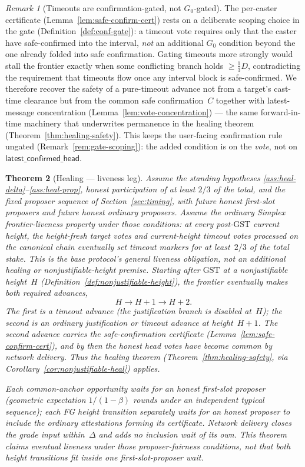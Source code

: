 \ifx\litemode\undefined\documentclass{article}\fi
\newcommand{\GST}{\ensuremath{\mathrm{GST}}\xspace}
\newcommand{\Dvote}{\ensuremath{D}}         %
\newcommand{\Gzero}{\ensuremath{G_{0}}}
\newcommand{\latestConfirmed}{\textsf{latest\_confirmed\_head}\xspace}
\theoremstyle{plain}
\newtheorem{theorem}{Theorem}
\theoremstyle{definition}
\theoremstyle{remark}
\newtheorem{remark}[theorem]{Remark}
\begin{document}
\begin{remark}[Timeouts are confirmation-gated, not \(\Gzero\)-gated]\label{rem:timeout-not-g0}
The per-caster certificate (Lemma~\ref{lem:safe-confirm-cert}) rests on a
deliberate scoping choice in the gate (Definition~\ref{def:conf-gate}): a timeout
vote requires only that the caster have safe-confirmed into the interval,
\emph{not} an additional \(\Gzero\) condition beyond the one already folded into
safe confirmation.  Gating timeouts more strongly would stall the frontier exactly
when some conflicting branch holds \(\geq \tfrac13\Dvote\), contradicting the
requirement that timeouts flow once any interval block is safe-confirmed.  We
therefore recover the safety of a pure-timeout advance not from a target's
cast-time clearance but from the common safe confirmation~\(C\) together with
latest-message concentration (Lemma~\ref{lem:vote-concentration}) --- the same forward-in-time
machinery that underwrites permanence in the healing theorem
(Theorem~\ref{thm:healing-safety}).  This keeps the user-facing confirmation rule
ungated (Remark~\ref{rem:gate-scoping}): the added condition is on the \emph{vote},
not on \(\latestConfirmed\).
\end{remark}

\begin{theorem}[Healing --- liveness leg]\label{thm:healing-liveness}
Assume the standing hypotheses \ref{ass:heal-delta}--\ref{ass:heal-prop}, honest
participation of at least \(2/3\) of the total, and the fixed proposer sequence
of Section~\ref{sec:timing}, with future honest first-slot proposers and future
honest ordinary proposers.  Assume the ordinary Simplex frontier-liveness
property under those conditions: at every post-\GST{} current height, the
height-fresh target votes and current-height timeout votes processed on the
canonical chain eventually set timeout markers for at least~\(2/3\) of the
total stake.  This is the base protocol's general liveness obligation, not an
additional healing or nonjustifiable-height premise.  Starting after \GST{} at
a nonjustifiable height~\(H\) (Definition~\ref{def:nonjustifiable-height}), the
frontier eventually makes both required advances,
\[
  H \longrightarrow H+1 \longrightarrow H+2 .
\]
The first is a timeout advance (the justification branch is disabled at~\(H\));
the second is an ordinary justification or timeout advance at height~\(H+1\).
The second advance carries the safe-confirmation certificate
(Lemma~\ref{lem:safe-confirm-cert}), and by then the honest head votes have
become common by network delivery.  Thus the healing theorem
(Theorem~\ref{thm:healing-safety}, via
Corollary~\ref{cor:nonjustifiable-heal}) applies.

Each common-anchor opportunity waits for an honest first-slot proposer
(geometric expectation \(1/(1-\beta)\) rounds under an independent typical
sequence); each FG height transition separately waits for an honest proposer
to include the ordinary attestations forming its certificate.  Network delivery
closes the grade input within~\(\Delta\) and adds no inclusion wait of its own.
This theorem claims eventual liveness under those proposer-fairness conditions,
not that both height transitions fit inside one first-slot-proposer wait.
\end{theorem}
\end{document}
